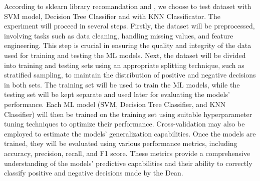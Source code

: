 According to sklearn library recomandation \cite{sklearn} and \cite{towards_class}, we choose to test dataset with SVM model, Decision Tree Classifier and with KNN Classificator.
The experiment will proceed in several steps. Firstly, the dataset will be preprocessed, involving tasks such as data cleaning, handling missing values, and feature engineering. This step is crucial in ensuring the quality and integrity of the data used for training and testing the ML models.
Next, the dataset will be divided into training and testing sets using an appropriate splitting technique, such as stratified sampling, to maintain the distribution of positive and negative decisions in both sets. The training set will be used to train the ML models, while the testing set will be kept separate and used later for evaluating the models' performance.
Each ML model (SVM, Decision Tree Classifier, and KNN Classifier) will then be trained on the training set using suitable hyperparameter tuning techniques to optimize their performance. Cross-validation may also be employed to estimate the models' generalization capabilities.
Once the models are trained, they will be evaluated using various performance metrics, including accuracy, precision, recall, and F1 score. These metrics provide a comprehensive understanding of the models' predictive capabilities and their ability to correctly classify positive and negative decisions made by the Dean.